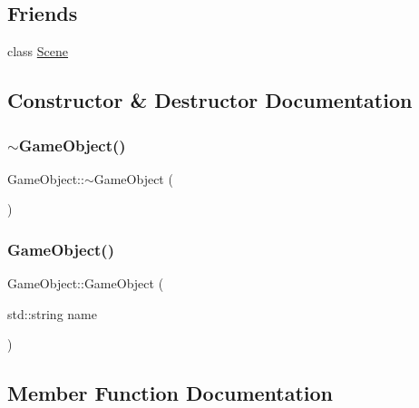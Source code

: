 \subsection*{Friends}
\begin{DoxyCompactItemize}
\item 
class \hyperlink{class_mason_1_1_game_object_a032858ae1fe02d2d1170981c2af2d67c}{Scene}
\end{DoxyCompactItemize}


\subsection{Constructor \& Destructor Documentation}
\hypertarget{class_mason_1_1_game_object_ab82dfdb656f9051c0587e6593b2dda97}{}\label{class_mason_1_1_game_object_ab82dfdb656f9051c0587e6593b2dda97} 
\subsubsection{\texorpdfstring{$\sim$\+Game\+Object()}{~GameObject()}}
{\footnotesize\ttfamily Game\+Object\+::$\sim$\+Game\+Object (\begin{DoxyParamCaption}{ }\end{DoxyParamCaption})}

\hypertarget{class_mason_1_1_game_object_a0737657696b478c7962c2a6c2f5b1bd8}{}\label{class_mason_1_1_game_object_a0737657696b478c7962c2a6c2f5b1bd8} 
\subsubsection{\texorpdfstring{Game\+Object()}{GameObject()}}
{\footnotesize\ttfamily Game\+Object\+::\+Game\+Object (\begin{DoxyParamCaption}\item[{std\+::string}]{name }\end{DoxyParamCaption})}



\subsection{Member Function Documentation}
\hypertarget{class_mason_1_1_game_object_a4df82cecf4dc31163f04bf01043a1ec8}{}\label{class_mason_1_1_game_object_a4df82cecf4dc31163f04bf01043a1ec8} 
